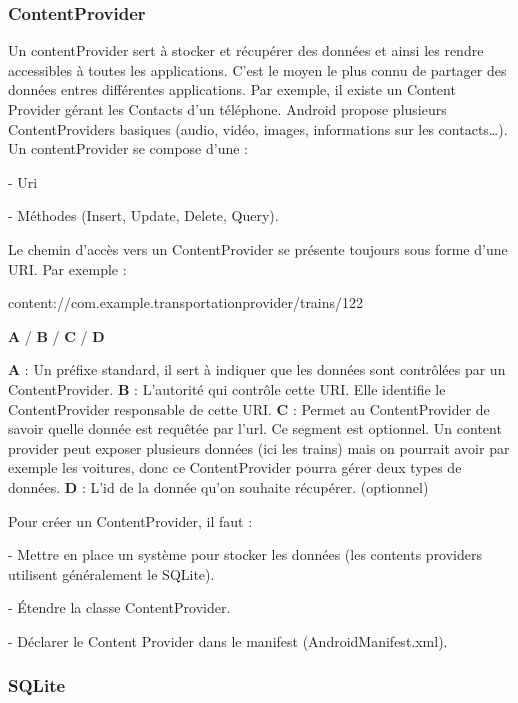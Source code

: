 \subsubsection{ContentProvider}


Un contentProvider sert à stocker et récupérer des données et ainsi les rendre accessibles à toutes les applications. C’est le moyen le plus connu de partager des données entres différentes applications. Par exemple, il existe un Content Provider gérant les Contacts d’un téléphone.
Android propose plusieurs ContentProviders basiques (audio, vidéo, images, informations sur les contacts…). Un contentProvider se compose d’une :

- Uri

- Méthodes (Insert, Update, Delete, Query).


Le chemin d’accès vers un ContentProvider se présente toujours sous forme d’une URI. Par exemple : 

content://com.example.transportationprovider/trains/122

  \textbf{A}      /          \textbf{B}            /    \textbf{C}  /  \textbf{D}  

\textbf{A} : Un préfixe standard, il sert à indiquer que les données sont contrôlées par un ContentProvider.
\newline
\textbf{B} : L’autorité qui contrôle cette URI. Elle identifie le ContentProvider responsable de cette URI. 
\newline
\textbf{C} : Permet au ContentProvider de savoir quelle donnée est requêtée par l’url. Ce segment est optionnel. Un content provider peut exposer plusieurs données (ici les trains) mais on pourrait avoir par exemple les voitures, donc ce ContentProvider pourra gérer deux types de données.
\newline
\textbf{D} : L’id de la donnée qu’on souhaite récupérer. (optionnel)


Pour créer un ContentProvider, il faut : 
    
- Mettre en place un système pour stocker les données (les contents providers utilisent généralement le SQLite).
    
- Étendre la classe ContentProvider.

- Déclarer le Content Provider dans le manifest (AndroidManifest.xml).\cite{provider} 


\subsubsection{SQLite}

